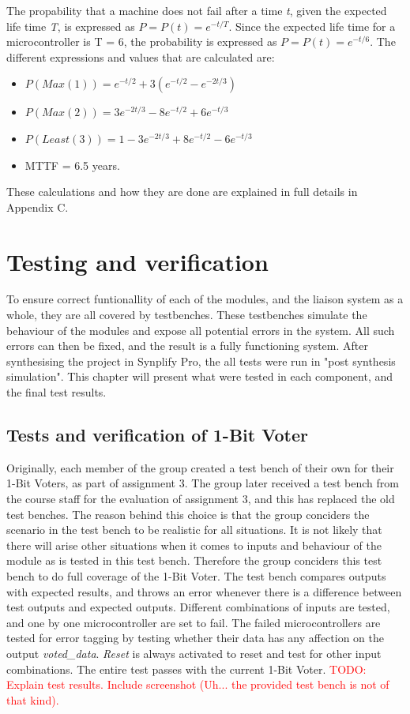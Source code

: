 \documentclass[a4paper]{IEEEtran}
\newcommand\TODO[1]{\textcolor{red}{TODO:#1}}
\newcommand\todo[1]{\TODO{#1}}
\begin{document}
The propability that a machine does not fail after a time \textit{t}, given the expected life time \textit{T}, is expressed as $P = P(t) = e^{-t/T}$.
Since the expected life time for a microcontroller is T = 6, the probability is expressed as $P = P(t) = e^{-t/6}$. 
The different expressions and values that are calculated are:
\begin{itemize}
    \item $P(Max(1)) = e^{-t/2}+3(e^{-t/2}-e^{-2t/3})$
    \item $P(Max(2)) = 3e^{-2t/3}-8e^{-t/2}+6e^{-t/3}$
    \item $P(Least(3)) = 1-3e^{-2t/3}+8e^{-t/2}-6e^{-t/3}$
    \item MTTF = 6.5 years.
\end{itemize}

These calculations and how they are done are explained in full details in Appendix C.

\section{ Testing and verification }
To ensure correct funtionallity of each of the modules, and the liaison system as a whole, they are all covered by testbenches.
These testbenches simulate the behaviour of the modules and expose all potential errors in the system.
All such errors can then be fixed, and the result is a fully functioning system.
After synthesising the project in Synplify Pro, the all tests were run in "post synthesis simulation".
This chapter will present what were tested in each component, and the final test results.

\subsection{ Tests and verification of 1-Bit Voter}
Originally, each member of the group created a test bench of their own for their 1-Bit Voters, as part of assignment 3.
The group later received a test bench from the course staff for the evaluation of assignment 3, and this has replaced the old test benches.
The reason behind this choice is that the group conciders the scenario in the test bench to be realistic for all situations.
It is not likely that there will arise other situations when it comes to inputs and behaviour of the module as is tested in this test bench.
Therefore the group conciders this test bench to do full coverage of the 1-Bit Voter.
The test bench compares outputs with expected results, and throws an error whenever there is a difference between test outputs and expected outputs.
Different combinations of inputs are tested, and one by one microcontroller are set to fail.
The failed microcontrollers are tested for error tagging by testing whether their data has any affection on the output \textit{voted\_data}.
\textit{Reset} is always activated to reset and test for other input combinations.
The entire test passes with the current 1-Bit Voter. 
\todo{ Explain test results. Include screenshot (Uh... the provided test bench is not of that kind).}
\end{document}
